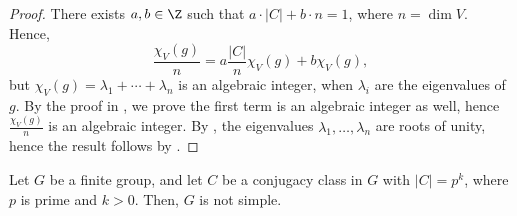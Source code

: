 \begin{proof}
    There exists $a,b \in \Z$ such that $a\cdot |C| + b\cdot n=1$, where $n = \dim V$. Hence,
    $$\frac{\chi_V(g)}{n}=a\frac{|C|}{n}\chi_V(g)+b\chi_V(g),$$
    but $\chi_V(g) = \lambda_1+\cdots + \lambda_n$ is an algebraic integer, when $\lambda_i$ are the eigenvalues of $g$. By the proof in , we prove the first term is an algebraic integer as well, hence $\frac{\chi_V(g)}{n}$ is an algebraic integer. By , the eigenvalues $\lambda_1,\dots,\lambda_n$ are roots of unity, hence the result follows by .
\end{proof}

\begin{thm}[][label=thm:burnthm2]
    Let $G$ be a finite group, and let $C$ be a conjugacy class in $G$ with $|C| = p^k$, where $p$ is prime and $k>0$. Then, $G$ is not simple.
\end{thm}

